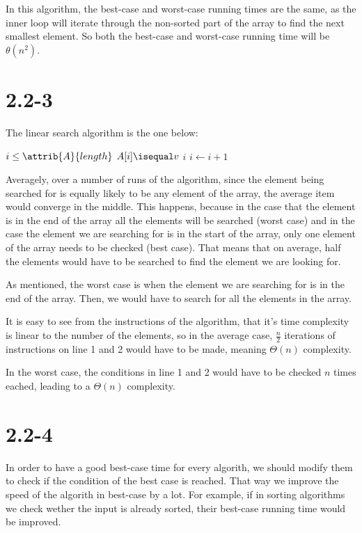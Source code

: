 \documentclass{article}
\begin{document}
In this algorithm, the best-case and worst-case running times are the same, as the inner loop will iterate through the non-sorted part of the array to find the next smallest element. So both the best-case and worst-case running time will be $\theta(n^2)$.

\section*{2.2-3}
The linear search algorithm is the one below: 

\begin{codebox}
  \li \While $i \leq \attrib{A}{length}$
  \li \Do
        \If $A[i] \isequal v$
  \li   \Then
          \Return $i$
        \End
  \li     $i \gets i + 1$
      \End
  \li \Return {}
\end{codebox}

Averagely, over a number of runs of the algorithm, since the element being searched for is equally likely to be any element of the array, the average item would converge in the middle. This happens, because in the case that the element is in the end of the array all the elements will be searched (worst case) and in the case the element we are searching for is in the start of the array, only one element of the array needs to be checked (best case). That means that on average, half the elements would have to be searched to find the element we are looking for. 

As mentioned, the worst case is when the element we are searching for is in the end of the array. Then, we would have to search for all the elements in the array.

It is easy to see from the instructions of the algorithm, that it's time complexity is linear to the number of the elements, so in the average case, $\frac{n}{2}$ iterations of instructions on line 1 and 2 would have to be made, meaning $\Theta(n)$ complexity.

In the worst case, the conditions in line 1 and 2 would have to be checked $n$ times eached, leading to a $\Theta(n)$ complexity. 

\section*{2.2-4}
In order to have a good best-case time for every algorith, we should modify them to check if the condition of the best case is reached. That way we improve the speed of the algorith in best-case by a lot. For example, if in sorting algorithms we check wether the input is already sorted, their best-case running time would be improved.
\end{document}
